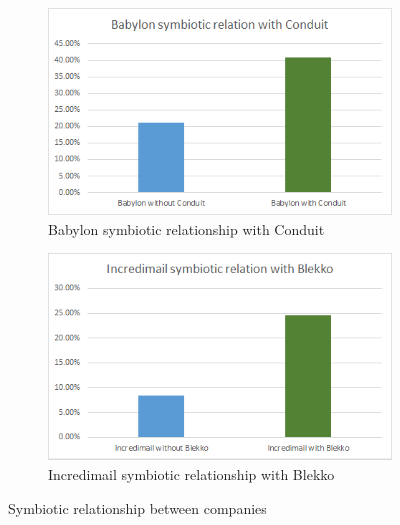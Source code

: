 \documentclass[11pt,oneside]{book}
\begin{document}
\begin{figure}[h]
\centering
\begin{subfigure}[b]{0.49\textwidth}
	\centering
\includegraphics[scale=0.49]{figures/babylon_sym_conduit.png}
\caption{Babylon symbiotic relationship with Conduit}
\label{fig:babylon_sym_conduit}
\end{subfigure}
\begin{subfigure}[b]{0.49\textwidth}
	\centering
\includegraphics[scale=0.49]{figures/incredi_sym_blekko.png}
\caption{Incredimail symbiotic relationship with Blekko}
\label{fig:incredi_sym_blekko}
\end{subfigure}
\caption{Symbiotic relationship between companies}
	\label{fig:symbiotic_pagerank}
\end{figure}
\end{document}
